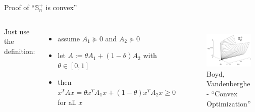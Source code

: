 \documentclass[aspectratio=169]{beamer}
\begin{document}
\begin{frame}{Proof of ``$\mathbb S_n^+$ is convex''}
\begin{columns}
Just use the definition:
\begin{itemize}
	\item
	assume $A_1 \succeq 0$ and $A_2 \succeq 0$
	\item
	let $A := \theta A_1 + (1- \theta) A_2$ with $\theta \in [0, 1]$
	\item
	then $x^T A x = \theta x^T A_1 x + (1- \theta) x^T A_2 x \geq 0$ for all $x$
\end{itemize}
	\begin{figure}
		\includegraphics[width=\columnwidth]{figures/psdcone.jpeg}
		\footnotesize Boyd, Vandenberghe - ``Convex Optimization''
	\end{figure}
\end{columns}
\end{frame}
\end{document}
